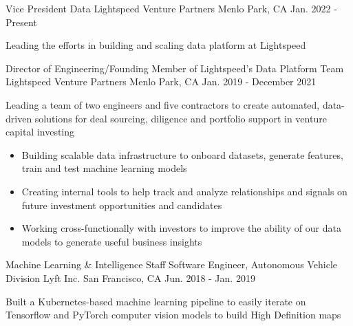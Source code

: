 

\begin{cventries}

\cventry
{Vice President Data} %
{Lightspeed Venture Partners} %
{Menlo Park, CA} %
{Jan. 2022 - Present} %
{
  \begin{cvitems} %
    \item{Leading the efforts in building and scaling data platform at Lightspeed}
  \end{cvitems}
}

  \cventry
    {Director of Engineering/Founding Member of Lightspeed's Data Platform Team} %
    {Lightspeed Venture Partners} %
    {Menlo Park, CA} %
    {Jan. 2019 - December 2021} %
    {
      \begin{cvitems} %
        \item{Leading a team of two engineers and five contractors to create automated, data-driven solutions for deal sourcing, diligence and portfolio support in venture capital investing}
        \begin{itemize}[label=$\circ$]
          \item{Building scalable data infrastructure to onboard datasets, generate features, train and test machine learning models}
          \item{Creating internal tools to help track and analyze relationships and signals on future investment opportunities and candidates}
          \item{Working cross-functionally with investors to improve the ability of our data models to generate useful business insights}
        \end{itemize}
      \end{cvitems}
    }

  \cventry
    {Machine Learning \& Intelligence Staff Software Engineer, Autonomous Vehicle Division} %
    {Lyft Inc.} %
    {San Francisco, CA} %
    {Jun. 2018 - Jan. 2019} %
    {
      \begin{cvitems} %
        \item{Built a Kubernetes-based machine learning pipeline to easily iterate on Tensorflow and PyTorch computer vision models to build High Definition maps}
      \end{cvitems}
    }


\end{cventries}
